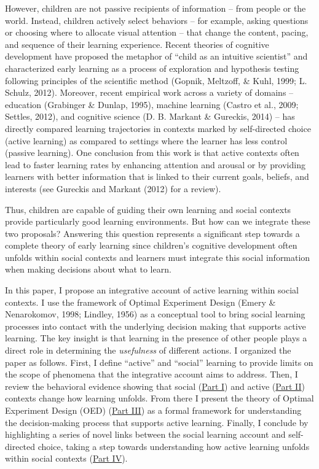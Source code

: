 \documentclass[english,floatsintext,man]{apa6}
\theoremstyle{definition}
\theoremstyle{definition}
\theoremstyle{definition}
\theoremstyle{remark}
\begin{document}
However, children are not passive recipients of information -- from
people or the world. Instead, children actively select behaviors -- for
example, asking questions or choosing where to allocate visual attention
-- that change the content, pacing, and sequence of their learning
experience. Recent theories of cognitive development have proposed the
metaphor of \enquote{child as an intuitive scientist} and characterized
early learning as a process of exploration and hypothesis testing
following principles of the scientific method (Gopnik, Meltzoff, \&
Kuhl, 1999; L. Schulz, 2012). Moreover, recent empirical work across a
variety of domains -- education (Grabinger \& Dunlap, 1995), machine
learning (Castro et al., 2009; Settles, 2012), and cognitive science (D.
B. Markant \& Gureckis, 2014) -- has directly compared learning
trajectories in contexts marked by self-directed choice (active
learning) as compared to settings where the learner has less control
(passive learning). One conclusion from this work is that active
contexts often lead to faster learning rates by enhancing attention and
arousal or by providing learners with better information that is linked
to their current goals, beliefs, and interests (see Gureckis and Markant
(2012) for a review).

Thus, children are capable of guiding their own learning and social
contexts provide particularly good learning environments. But how can we
integrate these two proposals? Answering this question represents a
significant step towards a complete theory of early learning since
children's cognitive development often unfolds within social contexts
and learners must integrate this social information when making
decisions about what to learn.

In this paper, I propose an integrative account of active learning
within social contexts. I use the framework of Optimal Experiment Design
(Emery \& Nenarokomov, 1998; Lindley, 1956) as a conceptual tool to
bring social learning processes into contact with the underlying
decision making that supports active learning. The key insight is that
learning in the presence of other people plays a direct role in
determining the \emph{usefulness} of different actions. I organized the
paper as follows. First, I define \enquote{active} and \enquote{social}
learning to provide limits on the scope of phenomena that the
integrative account aims to address. Then, I review the behavioral
evidence showing that social (\protect\hyperlink{p1}{Part I}) and active
(\protect\hyperlink{p2}{Part II}) contexts change how learning unfolds.
From there I present the theory of Optimal Experiment Design (OED)
(\protect\hyperlink{p3}{Part III}) as a formal framework for
understanding the decision-making process that supports active learning.
Finally, I conclude by highlighting a series of novel links between the
social learning account and self-directed choice, taking a step towards
understanding how active learning unfolds within social contexts
(\protect\hyperlink{p4}{Part IV}).
\end{document}

